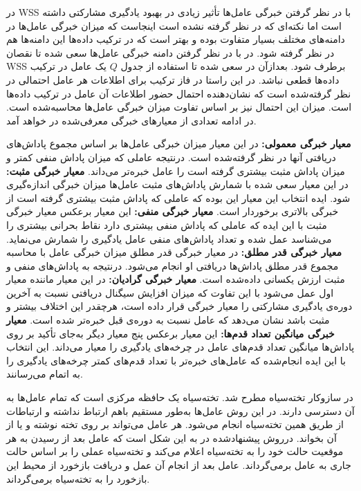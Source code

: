 در WSS با در نظر گرفتن خبرگی عامل‌ها تأثیر زیادی در بهبود یادگیری مشارکتی داشته است اما نکته‌ای که در نظر گرفته نشده است اینجاست که میزان خبرگی عامل‌ها در دامنه‌های مختلف بسیار متفاوت بوده و بهتر است که در ترکیب داده‌ها این دامنه‌ها هم در نظر گرفته شود. در  با در نظر گرفتن دامنه خبرگی عامل‌ها سعی شده تا نقصان WSS برطرف شود. بعدازآن در سعی شده تا استفاده از جدول $Q$ یک عامل در ترکیب داده‌ها قطعی نباشد. در این راستا در فاز ترکیب برای اطلاعات هر عامل احتمالی در نظر گرفته‌شده است که نشان‌دهنده احتمال حضور اطلاعات آن عامل در ترکیب داده‌ها است. میزان این احتمال نیز بر اساس تفاوت میزان خبرگی عامل‌ها محاسبه‌شده است. در ادامه تعدادی از معیارهای خبرگی معرفی‌شده در خواهد آمد.
\begin{itemize}
 \textbf{معیار خبرگی معمولی:} در این معیار میزان خبرگی عامل‌ها بر اساس مجموع پاداش‌های دریافتی آنها در نظر گرفته‌شده است. درنتیجه عاملی که میزان پاداش منفی کمتر و میزان پاداش مثبت بیشتری گرفته است را عامل خبره‌تر می‌داند.
 \textbf{معیار خبرگی مثبت:} در این معیار سعی شده با شمارش پاداش‌های مثبت عامل‌ها میزان خبرگی اندازه‌گیری شود. ایده انتخاب این معیار این بوده که عاملی که پاداش مثبت بیشتری گرفته است از خبرگی بالاتری برخوردار است.
 \textbf{معیار خبرگی منفی:} این معیار برعکس معیار خبرگی مثبت با این ایده که عاملی که پاداش منفی بیشتری دارد نقاط بحرانی بیشتری را می‌شناسد عمل شده و تعداد پاداش‌های منفی عامل یادگیری را شمارش می‌نماید.
 \textbf{معیار خبرگی قدر مطلق:} در معیار خبرگی قدر مطلق میزان خبرگی عامل با محاسبه مجموع قدر مطلق پاداش‌ها دریافتی او انجام می‌شود. درنتیجه به پاداش‌های منفی و مثبت ارزش یکسانی داده‌شده است.
 \textbf{معیار خبرگی گرادیان:} در این معیار ماننده معیار اول عمل می‌شود با این تفاوت که میزان افزایش سیگنال دریافتی نسبت به آخرین دوره‌ی یادگیری مشارکتی را معیار خبرگی قرار داده‌ است، هرچقدر این اختلاف بیشتر و مثبت باشد نشان می‌دهد که عامل نسبت به دوره‌ی قبل خبره‌تر شده است.
 \textbf{معیار خبرگی میانگین تعداد قدم‌ها:} این معیار برعکس پنج معیار دیگر به‌جای تأکید بر روی پاداش‌ها میانگین تعداد قدم‌های عامل در چرخه‌های یادگیری را معیار می‌داند. این انتخاب با این ایده انجام‌شده که عامل‌های خبره‌تر با تعداد قدم‌های کمتر چرخه‌های یادگیری را به اتمام می‌رسانند.
\end{itemize}

در سازوکار تخته‌سیاه مطرح شد. تخته‌سیاه یک حافظه مرکزی است که تمام عامل‌ها به آن دسترسی دارند. در این روش عامل‌ها به‌طور مستقیم باهم ارتباط نداشته و ارتباطات از طریق همین تخته‌سیاه انجام می‌شود. هر عامل می‌تواند بر روی تخته نوشته و یا از آن بخواند.
درروش پیشنهادشده در به این شکل است که عامل بعد از رسیدن به هر موقعیت حالت خود را به تخته‌سیاه اعلام می‌کند و تخته‌سیاه عملی را بر اساس حالت جاری به عامل برمی‌گرداند. عامل بعد از انجام آن عمل و دریافت بازخورد از محیط این بازخورد را به تخته‌سیاه برمی‌گرداند.

